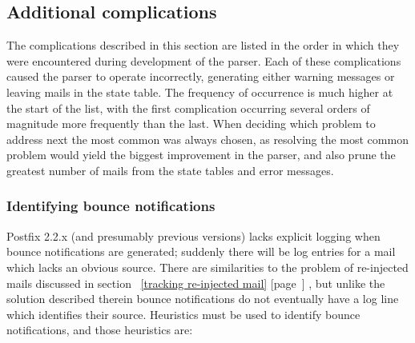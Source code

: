 \documentclass[a4paper,12pt,draft]{article}
\newcommand{\refwithpage}[1]{%
    \empty{}\ref{#1} [page~\pageref{#1}]%
}
\begin{document}
\subsection{Additional complications}

\label{additional complications}

The complications described in this section are listed in the order in
which they were encountered during development of the parser.  Each of
these complications caused the parser to operate incorrectly, generating
either warning messages or leaving mails in the state table.  The frequency
of occurrence is much higher at the start of the list, with the first
complication occurring several orders of magnitude more frequently than the
last.  When deciding which problem to address next the most common was
always chosen, as resolving the most common problem would yield the biggest
improvement in the parser, and also prune the greatest number of mails from
the state tables and error messages.


\subsubsection{Identifying bounce notifications}

\label{identifying-bounce-notifications}

Postfix 2.2.x (and presumably previous versions) lacks explicit logging
when bounce notifications are generated; suddenly there will be log entries
for a mail which lacks an obvious source.  There are similarities to the
problem of re-injected mails discussed in section~\refwithpage{tracking
re-injected mail}, but unlike the solution described therein bounce
notifications do not eventually have a log line which identifies their
source.  Heuristics must be used to identify bounce notifications, and
those heuristics are:
\end{document}
